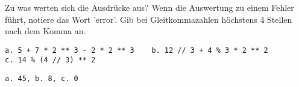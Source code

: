 \question[3]
Zu was werten sich die Ausdrücke aus? Wenn die Auswertung zu einem Fehler führt, notiere das
Wort 'error'. Gib bei Gleitkommazahlen höchstens 4 Stellen nach dem Komma an.
\begin{lstlisting}
a. 5 + 7 * 2 ** 3 - 2 * 2 ** 3    b. 12 // 3 + 4 % 3 * 2 ** 2
c. 14 % (4 // 3) ** 2
\end{lstlisting}
\begin{solutionbox}{2cm}
\begin{lstlisting}
a. 45, b. 8, c. 0
\end{lstlisting}
\end{solutionbox}
